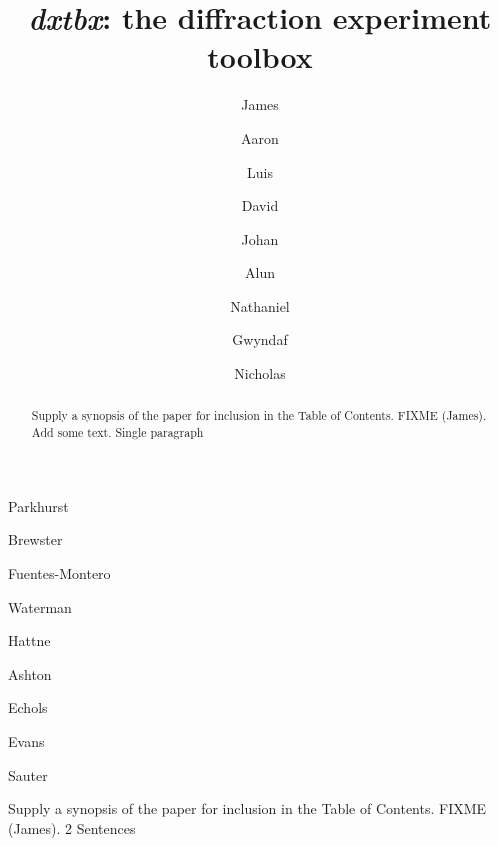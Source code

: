 \documentclass[preprint]{iucr}
\newcommand{\dxtbx}{\emph{dxtbx}\xspace}
\begin{document}
  \title{\dxtbx: the diffraction experiment toolbox}
  \shorttitle{\dxtbx}

  \author[a]{James}{Parkhurst}
  \author[b]{Aaron}{Brewster}
  \author[a]{Luis}{Fuentes-Montero}
  \author[c]{David}{Waterman}
  \author[b]{Johan}{Hattne}
  \author[a]{Alun}{Ashton}
  \author[b]{Nathaniel}{Echols}
  \author[a]{Gwyndaf}{Evans}
  \author[b]{Nicholas}{Sauter}


  \maketitle

\begin{synopsis}
Supply a synopsis of the paper for inclusion in the Table of Contents.
FIXME (James). 2 Sentences
\end{synopsis}

\begin{abstract}
Supply a synopsis of the paper for inclusion in the Table of Contents. FIXME 
(James). Add some text. Single paragraph
\end{abstract}

\end{document}
